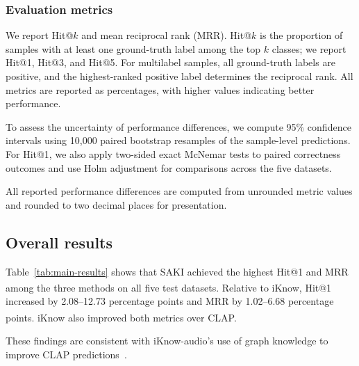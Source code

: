 \subsubsection{Evaluation metrics}\label{sec:evaluation-metrics}

We report Hit@$k$ and mean reciprocal rank (MRR). Hit@$k$ is the proportion of samples with at least one ground-truth label among the top $k$ classes; we report Hit@1, Hit@3, and Hit@5.  For multilabel samples, all ground-truth labels are positive, and the highest-ranked positive label determines the reciprocal rank. All metrics are reported as percentages, with higher values indicating better performance.


To assess the uncertainty of performance differences, we compute 95\% confidence intervals using 10,000 paired bootstrap resamples of the sample-level predictions. For Hit@1, we also apply two-sided exact McNemar tests to paired correctness outcomes and use Holm adjustment for comparisons across the five datasets.

All reported performance differences are computed from unrounded metric values and rounded to two decimal places for presentation.




\subsection{Overall results}\label{sec:overall-results}

Table~\ref{tab:main-results} shows that SAKI achieved the highest Hit@1 and MRR among the three methods on all five test datasets. Relative to iKnow\textsuperscript{\dag}, Hit@1 increased by 2.08--12.73 percentage points and MRR by 1.02--6.68 percentage points. iKnow\textsuperscript{\dag} also improved both metrics over CLAP. 

These findings are consistent with iKnow-audio's use of graph knowledge to improve CLAP predictions~\cite{olvera-etal-2025-iknow}. 


